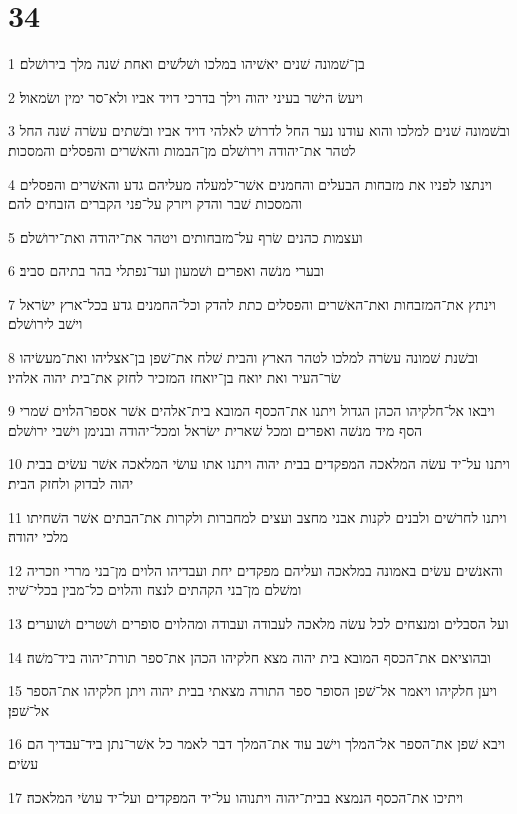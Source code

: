\chapter{34}

\par 1 בן־שׁמונה שׁנים יאשׁיהו במלכו ושׁלשׁים ואחת שׁנה מלך בירושׁלם׃
\par 2 ויעשׂ הישׁר בעיני יהוה וילך בדרכי דויד אביו ולא־סר ימין ושׂמאול׃
\par 3 ובשׁמונה שׁנים למלכו והוא עודנו נער החל לדרושׁ לאלהי דויד אביו ובשׁתים עשׂרה שׁנה החל לטהר את־יהודה וירושׁלם מן־הבמות והאשׁרים והפסלים והמסכות׃
\par 4 וינתצו לפניו את מזבחות הבעלים והחמנים אשׁר־למעלה מעליהם גדע והאשׁרים והפסלים והמסכות שׁבר והדק ויזרק על־פני הקברים הזבחים להם׃
\par 5 ועצמות כהנים שׂרף על־מזבחותים ויטהר את־יהודה ואת־ירושׁלם׃
\par 6 ובערי מנשׁה ואפרים ושׁמעון ועד־נפתלי בהר בתיהם סביב׃
\par 7 וינתץ את־המזבחות ואת־האשׁרים והפסלים כתת להדק וכל־החמנים גדע בכל־ארץ ישׂראל וישׁב לירושׁלם׃
\par 8 ובשׁנת שׁמונה עשׂרה למלכו לטהר הארץ והבית שׁלח את־שׁפן בן־אצליהו ואת־מעשׂיהו שׂר־העיר ואת יואח בן־יואחז המזכיר לחזק את־בית יהוה אלהיו׃
\par 9 ויבאו אל־חלקיהו הכהן הגדול ויתנו את־הכסף המובא בית־אלהים אשׁר אספו־הלוים שׁמרי הסף מיד מנשׁה ואפרים ומכל שׁארית ישׂראל ומכל־יהודה ובנימן וישׁבי ירושׁלם׃
\par 10 ויתנו על־יד עשׂה המלאכה המפקדים בבית יהוה ויתנו אתו עושׂי המלאכה אשׁר עשׂים בבית יהוה לבדוק ולחזק הבית׃
\par 11 ויתנו לחרשׁים ולבנים לקנות אבני מחצב ועצים למחברות ולקרות את־הבתים אשׁר השׁחיתו מלכי יהודה׃
\par 12 והאנשׁים עשׂים באמונה במלאכה ועליהם מפקדים יחת ועבדיהו הלוים מן־בני מררי וזכריה ומשׁלם מן־בני הקהתים לנצח והלוים כל־מבין בכלי־שׁיר׃
\par 13 ועל הסבלים ומנצחים לכל עשׂה מלאכה לעבודה ועבודה ומהלוים סופרים ושׁטרים ושׁוערים׃
\par 14 ובהוציאם את־הכסף המובא בית יהוה מצא חלקיהו הכהן את־ספר תורת־יהוה ביד־משׁה׃
\par 15 ויען חלקיהו ויאמר אל־שׁפן הסופר ספר התורה מצאתי בבית יהוה ויתן חלקיהו את־הספר אל־שׁפן׃
\par 16 ויבא שׁפן את־הספר אל־המלך וישׁב עוד את־המלך דבר לאמר כל אשׁר־נתן ביד־עבדיך הם עשׂים׃
\par 17 ויתיכו את־הכסף הנמצא בבית־יהוה ויתנוהו על־יד המפקדים ועל־יד עושׂי המלאכה׃

